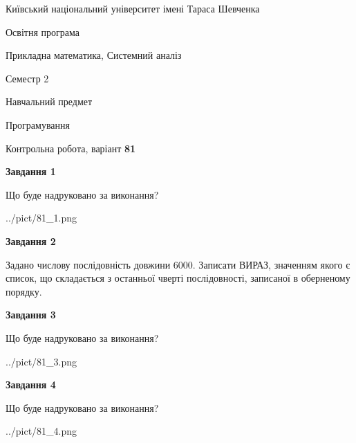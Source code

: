\documentclass[12pt, ukrainian]{article}
\begin{document}
{{\begin {small}\par
{ \center  Київський національний університет імені Тараса Шевченка \par}
{\parbox {5 cm}{Освітня програма \hfill}{\parbox {8 cm}{Прикладна математика, Системний аналіз \hfill}}\parbox {5 cm}{\hfill Семестр 2}}\par
{\parbox {5 cm} {Навчальний предмет \hfill}\parbox {7 cm}{Програмування \hfill}\parbox {6cm}{\hfill}\par}\vspace{-7pt} \end{small}}{\center Контрольна робота, варіант  \No \textbf
{ 81 }\par}}
{
\begin {large}
{\begin {center}\textbf{Завдання 1}\end {center}}\par
Що буде надруковано за виконання?\par\par
\begin{center}
	{../pict/81_1.png}
\end{center}
\newpage

{\begin {center}\textbf{Завдання 2}\end {center}}\par

 Задано числову послідовність  довжини 6000. Записати ВИРАЗ, значенням якого є список, що складається з останньої чверті послідовності, записаної в оберненому порядку.\par
\newpage

{\begin {center}\textbf{Завдання 3}\end {center}}\par
Що буде надруковано за виконання?\par
\begin{center}
	{../pict/81_3.png}
\end{center}
\newpage

{\begin {center}\textbf{Завдання 4}\end {center}}\par
Що буде надруковано за виконання?\par
\begin{center}
	{../pict/81_4.png}
\end{center}
\newpage


\end{large}}
\end{document}
